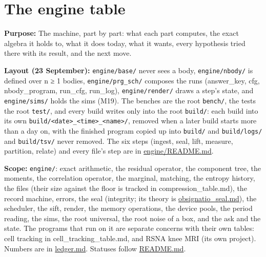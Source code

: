 \chapter{\texorpdfstring{The engine table}{The engine table}}
\label{chap:engine-table}

\textbf{Purpose:} The machine, part by part: what each part computes, the exact algebra it holds to, what it does today, what it wants, every hypothesis tried there with its result, and the next move.

\textbf{Layout (23 September):} \texttt{engine/\allowbreak{}base/\allowbreak{}} never sees a body, \texttt{engine/\allowbreak{}nbody/\allowbreak{}} is defined over n ≥ 1 bodies, \texttt{engine/\allowbreak{}prg\_\allowbreak{}sch/\allowbreak{}} composes the runs (answer\_\allowbreak{}key, cfg, nbody\_\allowbreak{}program, run\_\allowbreak{}cfg, run\_\allowbreak{}log), \texttt{engine/\allowbreak{}render/\allowbreak{}} draws a step's state, and \texttt{engine/\allowbreak{}sims/\allowbreak{}} holds the sims (M19). The benches are the root \texttt{bench/\allowbreak{}}, the tests the root \texttt{test/\allowbreak{}}, and every build writes only into the root \texttt{build/\allowbreak{}}: each build into its own \texttt{build/\allowbreak{}<date>\_\allowbreak{}<time>\_\allowbreak{}<name>/\allowbreak{}}, removed when a later build starts more than a day on, with the finished program copied up into \texttt{build/\allowbreak{}} and \texttt{build/\allowbreak{}logs/\allowbreak{}} and \texttt{build/\allowbreak{}tsv/\allowbreak{}} never removed. The six steps (ingest, seal, lift, measure, partition, relate) and every file's step are in \href{https://github.com/dstroy0/cell_tracking/blob/main/engine/README.md}{engine/README.md}.

\textbf{Scope:} \texttt{engine/\allowbreak{}}: exact arithmetic, the residual operator, the component tree, the moments, the correlation operator, the marginal, matching, the entropy history, the files (their size against the floor is tracked in compression\_\allowbreak{}table.md), the record machine, errors, the seal (integrity; its theory is \hyperref[chap:obsignatio-seal]{obsignatio\_\allowbreak{}seal.md}), the scheduler, the sift, render, the memory operations, the device pools, the period reading, the sims, the root universal, the root noise of a box, and the ask and the state. The programs that run on it are separate concerns with their own tables: cell tracking in cell\_\allowbreak{}tracking\_\allowbreak{}table.md, and RSNA knee MRI (its own project). Numbers are in \hyperref[chap:ledger]{ledger.md}. Statuses follow \hyperref[chap:readme]{README.md}.

